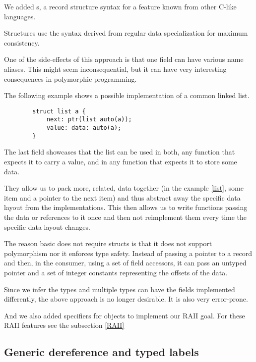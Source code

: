 We added s, a record structure syntax for a feature known from other C-like languages.

Structures use the syntax derived from regular data specialization for maximum consistency.

One of the side-effects of this approach is that one field can have various name aliases. This might seem inconsequential, but it can have very interesting consequences in polymorphic programming.

\begin{ex}
    \label{list}
    The following example shows a possible implementation of a common linked list.

    \begin{lstlisting}
        struct list a {
            next: ptr(list auto(a));
            value: data: auto(a);
        }
    \end{lstlisting}

    The last field showcases that the list can be used in both, any function that expects it to carry a value, and in any function that expects it to store some data.
\end{ex}

They allow us to pack more, related, data together (in the example \ref{list}, some item and a pointer to the next item) and thus abstract away the specific data layout from the implementations. This then allows us to write functions passing the data or references to it once and then not reimplement them every time the specific data layout changes.

The reason basic \cmm does not require structs is that it does not support polymorphism nor it enforces type safety. Instead of passing a pointer to a record and then, in the consumer, using a set of field accessors, it can pass an untyped pointer and a set of integer constants representing the offsets of the data.

Since we infer the types and multiple types can have the fields implemented differently, the above approach is no longer desirable. It is also very error-prone.

And we also added  specifiers for  objects to implement our RAII goal. For these RAII features see the subsection \ref{RAII}

\subsection{Generic dereference and typed labels}


